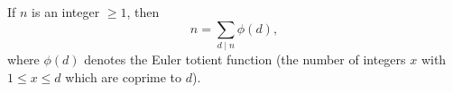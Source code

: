 If $n$ is an integer $\geq 1$, then
$$n = \sum_{d \mid n} \phi(d),$$
where $\phi(d)$ denotes the Euler totient function (the number of integers $x$ with $1 \leq x \leq d$ which are coprime to $d$).
